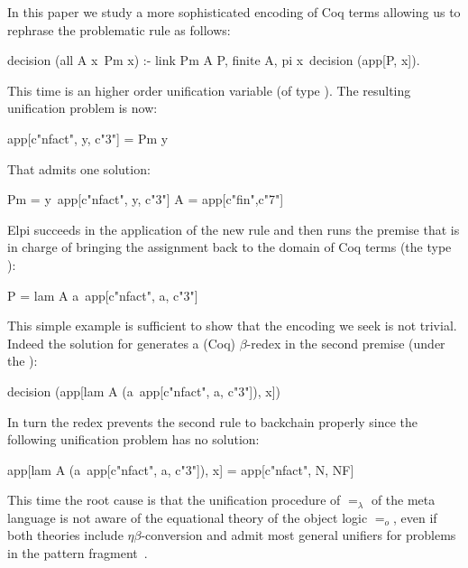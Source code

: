\documentclass[sigconf,natbib=false]{acmart}
\newcommand{\U}{\ensuremath{=_o}\xspace}
\newcommand{\Ue}{\ensuremath{=_\lambda}\xspace}
\begin{document}
\noindent
In this paper we study a more sophisticated encoding of Coq terms allowing
us to rephrase the problematic rule as follows:

\begin{elpicode}
decision (all A x\ Pm x) :- link Pm A P, finite A,
  pi x\ decision (app[P, x]).
\end{elpicode}

\noindent
This time  is an higher order unification variable (of type
). The resulting unification problem is now:

\begin{elpicode}
app[c"nfact", y, c"3"] = Pm y
\end{elpicode}

\noindent
That admits one solution:

\begin{elpicode}
Pm = y\ app[c"nfact", y, c"3"]
A = app[c"fin",c"7"]
\end{elpicode}
  
\noindent
Elpi succeeds in the application of the new rule and then runs
the premise  that is in charge of bringing the
assignment back to the domain of Coq terms (the type ):

\begin{elpicode}
P = lam A a\ app[c"nfact", a, c"3"]
\end{elpicode}

\noindent
This simple example is sufficient to show that the encoding we seek
is not trivial. Indeed the solution for  generates a
(Coq) $\beta$-redex in the second premise (under the ):

\begin{elpicode}
decision (app[lam A (a\ app[c"nfact", a, c"3"]), x])
\end{elpicode}

\noindent
In turn the redex prevents the second rule to backchain properly since
the following unification problem has no solution:

\begin{elpicode}
app[lam A (a\ app[c"nfact", a, c"3"]), x] =
app[c"nfact", N, NF]
\end{elpicode}

\noindent
This time the root cause is that the unification procedure of \Ue of the
meta language is not aware of the equational theory of the object logic \U,
even if both theories include $\eta\beta$-conversion and admit most general
unifiers for problems in the pattern fragment~\cite{miller92jsc}.
\end{document}
